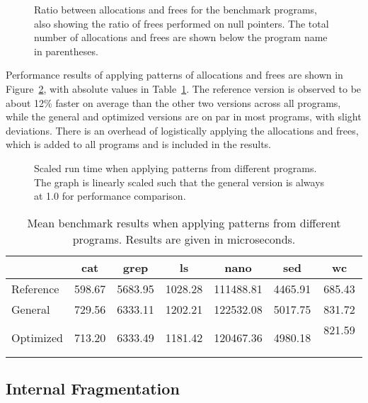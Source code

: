\begin{figure}[h]
    \centering
    
    \caption{Ratio between allocations and frees for the benchmark programs, also showing the ratio of frees performed on null pointers. The total number of allocations and frees are shown below the program name in parentheses.}
    \label{fig:program_ratios}
\end{figure}

Performance results of applying patterns of allocations and frees are shown in Figure~\ref{fig:program_benchmarks}, with absolute values in Table~\ref{table:program_benchmarks}. The reference version is observed to be about 12\% faster on average than the other two versions across all programs, while the general and optimized versions are on par in most programs, with slight deviations. There is an overhead of logistically applying the allocations and frees, which is added to all programs and is included in the results.

\begin{figure}[h]
    \centering
    
    \caption{Scaled run time when applying patterns from different programs. The graph is linearly scaled such that the general version is always at 1.0 for performance comparison.}
    \label{fig:program_benchmarks}
\end{figure}

\begin{table}[h]
    \centering
    \begin{tabular}{p{3.44cm}|cccccc}
    {} & {cat} & {grep} & {ls} & {nano} & {sed} & {wc} \\
    \hline
    Reference & 598.67 & 5683.95 & 1028.28 & 111488.81 & 4465.91 & 685.43 \\
    General   & 729.56 & 6333.11 & 1202.21 & 122532.08 & 5017.75 & 831.72 \\
    Optimized & 713.20 & 6333.49 & 1181.42 & 120467.36 & 4980.18 & 821.59 \
    \end{tabular}
    \caption{Mean benchmark results when applying patterns from different programs. Results are given in microseconds.}
    \label{table:program_benchmarks}
\end{table}

\FloatBarrier

\subsection{Internal Fragmentation}

